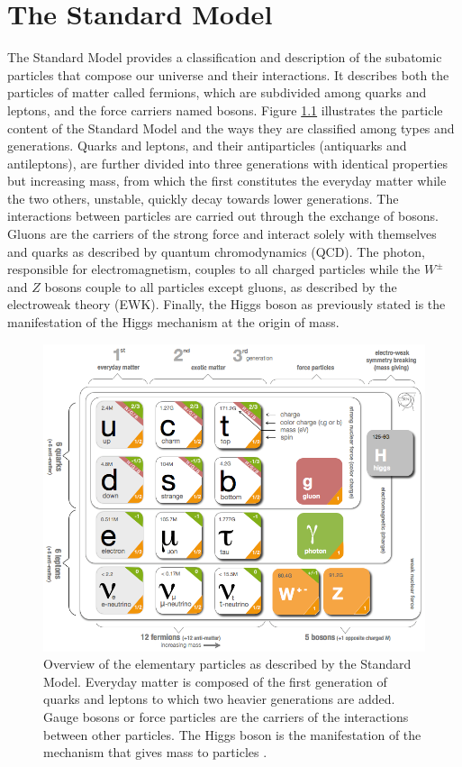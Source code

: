 
\chapter{The Standard Model}
\label{chap:I-1-standard-model}

  The Standard Model provides a classification and description of the subatomic particles that compose our universe and their interactions. It describes both the particles of matter called fermions, which are subdivided among quarks and leptons, and the force carriers named bosons. Figure \ref{fig:I-1-sm-particles} illustrates the particle content of the Standard Model and the ways they are classified among types and generations. Quarks and leptons, and their antiparticles (antiquarks and antileptons), are further divided into three generations with identical properties but increasing mass, from which the first constitutes the everyday matter while the two others, unstable, quickly decay towards lower generations. The interactions between particles are carried out through the exchange of bosons. Gluons are the carriers of the strong force and interact solely with themselves and quarks as described by quantum chromodynamics (QCD). The photon, responsible for electromagnetism, couples to all charged particles while the $ W^\pm $ and $ Z $ bosons couple to all particles except gluons, as described by the electroweak theory (EWK). Finally, the Higgs boson as previously stated is the manifestation of the Higgs mechanism at the origin of mass. \\

	\begin{figure}[h!]
		\centering
		\includegraphics[width=\textwidth]{img/I-1-standard-model/sm-particles.png}
		\caption{Overview of the elementary particles as described by the Standard Model. Everyday matter is composed of the first generation of quarks and leptons to which two heavier generations are added. Gauge bosons or force particles are the carriers of the interactions between other particles. The Higgs boson is the manifestation of the mechanism that gives mass to particles \cite{HOME-CERN}.}
		\label{fig:I-1-sm-particles}
	\end{figure}

